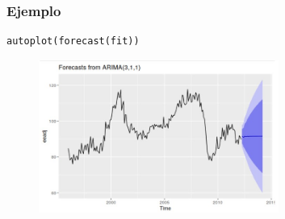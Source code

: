 \documentclass[10pt]{beamer}
\begin{document}




\begin{frame}[fragile]
\frametitle{Ejemplo}


\lstset{language=r,label= ,caption= ,captionpos=b,numbers=none}
\begin{lstlisting}
autoplot(forecast(fit))
\end{lstlisting}

\pause


\begin{figure}
\begin{center}
    \includegraphics[width=0.7\textwidth]{Imagen19.JPG}
\end{center}
\end{figure}

\end{frame}


\end{document}
